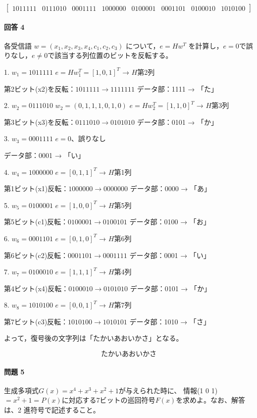 \documentclass[dvipdfmx,titlepage,a4j]{jsarticle}
\begin{document}
\[
    \begin{bmatrix}
        1011111 & 0111010 & 0001111 & 1000000 & 0100001 & 0001101 & 0100010 & 1010100
\end{bmatrix}
\]

\paragraph{ 回答 4\\}
各受信語 $w=(x_1,x_2,x_3,x_4,c_1,c_2,c_3)$ について，$e=H w^T$ を計算し，$e=0$で誤りなし，$e\neq0$で該当する列位置のビットを反転する。

1. $w_1=1011111$  
   $e=H w_1^T = [1,0,1]^T$ → $H$第2列

   第2ビット(x2)を反転：$1011111 \to 1111111$  
   データ部：1111 → 「た」

2. $w_2=0111010$  
   $w_2=(0,1,1,1,0,1,0)$  
   $e = H w_2^T = [1,1,0]^T$ → $H$第3列

   第3ビット(x3)を反転：$0111010 \to 0101010$  
   データ部：0101 → 「か」

3. $w_3=0001111$  
   $e=0$、誤りなし  

   データ部：0001 → 「い」

4. $w_4=1000000$  
   $e=[0,1,1]^T$ → $H$第1列

   第1ビット(x1)反転：$1000000 \to 0000000$  
   データ部：0000 → 「あ」

5. $w_5=0100001$  
   $e=[1,0,0]^T$ → $H$第5列

   第5ビット(c1)反転：$0100001 \to 0100101$  
   データ部：0100 → 「お」

6. $w_6=0001101$  
   $e=[0,1,0]^T$ → $H$第6列

   第6ビット(c2)反転：$0001101 \to 0001111$  
   データ部：0001 → 「い」

7. $w_7=0100010$  
   $e=[1,1,1]^T$ → $H$第4列

   第4ビット(x4)反転：$0100010 \to 0101010$  
   データ部：0101 → 「か」

8. $w_8=1010100$  
   $e=[0,0,1]^T$ → $H$第7列

   第7ビット(c3)反転：$1010100 \to 1010101$  
   データ部：1010 → 「さ」

よって，復号後の文字列は「たかいあおいかさ」となる。

\[
\boxed{\text{たかいあおいかさ}}
\]

\paragraph{ 問題 5\\}
生成多項式$G(x)=x^4+x^3+x^2+1$が与えられた時に、
情報(1 0 1)$=x^2 + 1 = P(x)$に対応する7ビットの巡回符号$F(x)$を求めよ。なお、解答は、2 進符号で記述すること。
\end{document}
